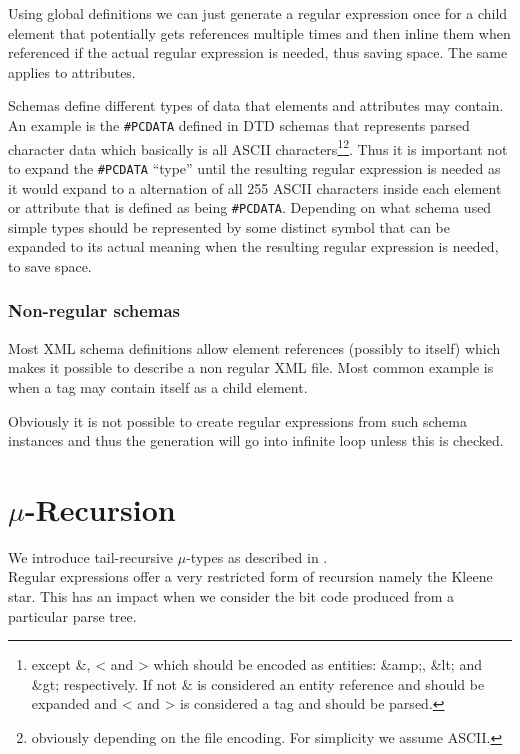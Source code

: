 \documentclass[a4paper, oneside]{memoir}
\theoremstyle{definition}
\begin{document}
Using global definitions we can just generate a regular expression once for a
child element that potentially gets references multiple times and then inline
them when referenced if the actual regular expression is needed, thus saving
space. The same applies to attributes.
\label{sec:global-definitions-save-space}

Schemas define different types of data that elements and attributes may
contain. An example is the \texttt{\#PCDATA} defined in DTD schemas that
represents parsed character data which basically is all ASCII
characters\footnote{except \&, < and > which should be encoded as entities:
  \&amp;, \&lt; and \&gt; respectively. If not \& is considered an entity
  reference and should be expanded and < and > is considered a tag and should be
  parsed.}\footnote{obviously depending on the file encoding. For simplicity we
  assume ASCII.}. Thus it is important not to expand the \texttt{\#PCDATA}
``type'' until the resulting regular expression is needed as it would expand to
a alternation of all 255 ASCII characters inside each element or attribute that
is defined as being \texttt{\#PCDATA}. Depending on what schema used simple
types should be represented by some distinct symbol that can be expanded to its
actual meaning when the resulting regular expression is needed, to save space.

\subsection{Non-regular schemas}

Most XML schema definitions allow element references (possibly to itself) which
makes it possible to describe a non regular XML file. Most common example is
when a tag may contain itself as a child element.

Obviously it is not possible to create regular expressions from such schema
instances and thus the generation will go into infinite loop unless this is
checked.

\chapter{$\mu$-Recursion}
\label{chap:mu-recursion}

We introduce tail-recursive $\mu$-types as described in \cite{heni2010}.\\[1em]

Regular expressions offer a very restricted form of recursion namely the Kleene
star. This has an impact when we consider the bit code produced from a
particular parse tree.
\end{document}
